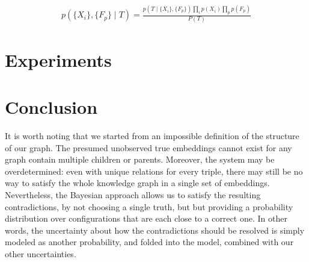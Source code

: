 \documentclass[11pt]{article}
\begin{document}
\begin{align*}
p(\{X_i\}, \{F_p\}\mid T) = \frac{p(T\mid \{X_i\}, \{F_p\}) \prod_i p(X_i)\prod_p p(F_p)}{P(T)}
\end{align*}


\section{Experiments}

\section{Conclusion}

It is worth noting that we started from an impossible definition of the structure of our graph. The presumed unobserved true embeddings cannot exist for any graph contain multiple children or parents. Moreover, the system may be overdetermined: even with unique relations for every triple, there may still be no way to satisfy the whole knowledge graph in a single set of embeddings. Nevertheless, the Bayesian approach allows us to satisfy the resulting contradictions, by not choosing a single truth, but but providing a probability distribution over configurations that are each close to a correct one. In other words, the uncertainty about how the contradictions should be resolved is simply modeled as another probability, and folded into the model, combined with our other uncertainties. 


\end{document}
